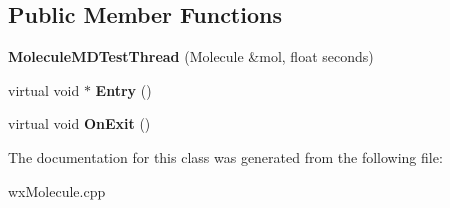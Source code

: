 \subsection*{Public Member Functions}
\begin{DoxyCompactItemize}
\item 
\mbox{\label{class_obj_cryst_1_1_molecule_m_d_test_thread_a1cf52cfd886aacbc164bba0af37fdcc7}} 
{\bfseries Molecule\+M\+D\+Test\+Thread} (Molecule \&mol, float seconds)
\item 
\mbox{\label{class_obj_cryst_1_1_molecule_m_d_test_thread_aaa24a448e20069f22ba484746d604fb4}} 
virtual void $\ast$ {\bfseries Entry} ()
\item 
\mbox{\label{class_obj_cryst_1_1_molecule_m_d_test_thread_a03294e883b41b260e9f77ab17dba6674}} 
virtual void {\bfseries On\+Exit} ()
\end{DoxyCompactItemize}


The documentation for this class was generated from the following file\+:\begin{DoxyCompactItemize}
\item 
wx\+Molecule.\+cpp\end{DoxyCompactItemize}
